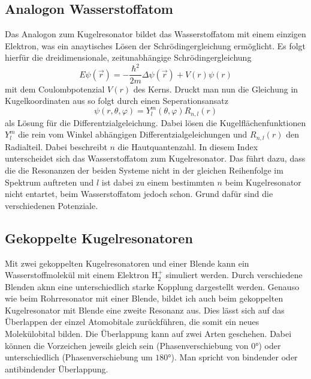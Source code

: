 \subsection{Analogon Wasserstoffatom}
Das Analogon zum Kugelresonator bildet das Wasserstoffatom mit einem einzigen Elektron, was ein anaytisches
Lösen der Schrödingergleichung ermöglicht.
Es folgt hierfür die dreidimensionale, zeitunabhängige Schrödingergleichung
\begin{equation}
    E\psi(\vec{r})=-\frac{\hbar^2}{2m}\Delta\psi(\vec{r})+V(r)\psi(r)
\end{equation}
mit dem Coulombpotenzial $V(r)$ des Kerns. Druckt man nun die Gleichung in Kugelkoordinaten aus
so folgt durch einen Seperationsansatz 
\begin{equation}
    \psi(r{,}\theta{,}\varphi)=Y_l^m(\theta{,}\varphi)R_{n{,}l}(r)
\end{equation}
als Lösung für die Differentzialgeleichung. Dabei lösen die Kugelflächenfunktionen $Y_l^m$
die rein vom Winkel abhängigen Differentzialgeleichungen und $R_{n{,}l}(r)$ den Radialteil. Dabei beschreibt
$n$ die Hautquantenzahl. In diesem Index unterscheidet sich das Wasserstoffatom zum Kugelresonator. Das führt dazu, dass die
die Resonanzen der beiden Systeme nicht in der gleichen Reihenfolge im Spektrum auftreten und $l$ ist dabei zu einem bestimmten
$n$ beim Kugelresonator nicht entartet, beim Wasserstoffatom jedoch schon. Grund dafür sind die verschiedenen Potenziale.

\subsection{Gekoppelte Kugelresonatoren}
Mit zwei gekoppelten Kugelresonatoren und einer Blende kann ein Wasserstoffmolekül mit einem Elektron $\text{H}_2^+$ simuliert werden.
Durch verschiedene Blenden aknn eine unterschiedlich starke Kopplung dargestellt werden.
Genauso wie beim Rohrresonator mit einer Blende, bildet ich auch beim gekoppelten Kugelresonator mit Blende eine zweite Resonanz aus.
Dies lässt sich auf das Überlappen der einzel Atomobitale zurückführen, die somit ein neues Molekülobital bilden. Die Überlappung kann auf zwei Arten geschehen.
Dabei können die Vorzeichen jeweils gleich sein (Phasenverschiebung von $0°$) oder unterschiedlich (Phasenverschiebung um $180°$). Man spricht von
bindender oder antibindender Überlappung.\\

